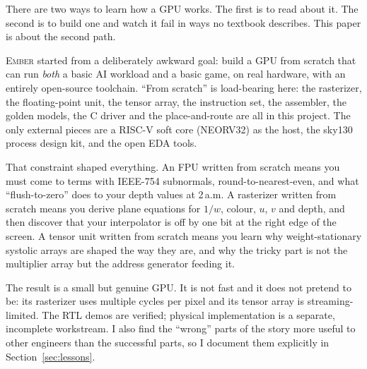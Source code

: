 \documentclass[conference]{IEEEtran}
\newcommand{\ember}{\textsc{Ember}}
\begin{document}
There are two ways to learn how a GPU works. The first is to read about it. The
second is to build one and watch it fail in ways no textbook describes. This
paper is about the second path.

\ember{} started from a deliberately awkward goal: build a GPU from scratch that
can run \emph{both} a basic AI workload and a basic game, on real hardware,
with an entirely open-source toolchain. ``From scratch'' is load-bearing here:
the rasterizer, the floating-point unit, the tensor array, the instruction set,
the assembler, the golden models, the C driver and the place-and-route are all
in this project. The only external pieces are a RISC-V soft core (NEORV32) as the
host, the sky130 process design kit, and the open EDA tools.

That constraint shaped everything. An FPU written from scratch means you must
come to terms with IEEE-754 subnormals, round-to-nearest-even, and what
``flush-to-zero'' does to your depth values at 2\,a.m. A rasterizer written from
scratch means you derive plane equations for $1/w$, colour, $u$, $v$ and depth,
and then discover that your interpolator is off by one bit at the right edge of
the screen. A tensor unit written from scratch means you learn why weight-stationary
systolic arrays are shaped the way they are, and why the tricky part is not the
multiplier array but the address generator feeding it.

The result is a small but genuine GPU. It is not fast and it does not pretend to
be: its rasterizer uses multiple cycles per pixel and its tensor array is
streaming-limited. The RTL demos are verified; physical implementation is a
separate, incomplete workstream. I
also find the ``wrong'' parts of the story more useful to other engineers than
the successful parts, so I document them explicitly in
Section~\ref{sec:lessons}.
\end{document}
